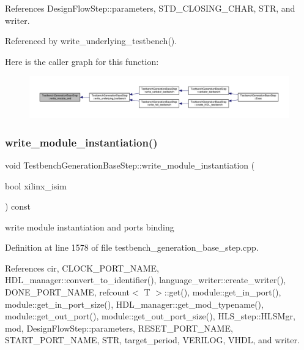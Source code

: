 References Design\+Flow\+Step\+::parameters, S\+T\+D\+\_\+\+C\+L\+O\+S\+I\+N\+G\+\_\+\+C\+H\+AR, S\+TR, and writer.



Referenced by write\+\_\+underlying\+\_\+testbench().

Here is the caller graph for this function\+:
\nopagebreak
\begin{figure}[H]
\begin{center}
\leavevmode
\includegraphics[width=350pt]{dc/d02/classTestbenchGenerationBaseStep_ae306dc453042f5b49d7a0a7efdbd094a_icgraph}
\end{center}
\end{figure}
\mbox{\label{classTestbenchGenerationBaseStep_aaa5345d601cfdea191b4f42906095e8e}} 
\subsubsection{\texorpdfstring{write\+\_\+module\+\_\+instantiation()}{write\_module\_instantiation()}}
{\footnotesize\ttfamily void Testbench\+Generation\+Base\+Step\+::write\+\_\+module\+\_\+instantiation (\begin{DoxyParamCaption}\item[{bool}]{xilinx\+\_\+isim }\end{DoxyParamCaption}) const\hspace{0.3cm}{\ttfamily [protected]}}

write module instantiation and ports binding 

Definition at line 1578 of file testbench\+\_\+generation\+\_\+base\+\_\+step.\+cpp.



References cir, C\+L\+O\+C\+K\+\_\+\+P\+O\+R\+T\+\_\+\+N\+A\+ME, H\+D\+L\+\_\+manager\+::convert\+\_\+to\+\_\+identifier(), language\+\_\+writer\+::create\+\_\+writer(), D\+O\+N\+E\+\_\+\+P\+O\+R\+T\+\_\+\+N\+A\+ME, refcount$<$ T $>$\+::get(), module\+::get\+\_\+in\+\_\+port(), module\+::get\+\_\+in\+\_\+port\+\_\+size(), H\+D\+L\+\_\+manager\+::get\+\_\+mod\+\_\+typename(), module\+::get\+\_\+out\+\_\+port(), module\+::get\+\_\+out\+\_\+port\+\_\+size(), H\+L\+S\+\_\+step\+::\+H\+L\+S\+Mgr, mod, Design\+Flow\+Step\+::parameters, R\+E\+S\+E\+T\+\_\+\+P\+O\+R\+T\+\_\+\+N\+A\+ME, S\+T\+A\+R\+T\+\_\+\+P\+O\+R\+T\+\_\+\+N\+A\+ME, S\+TR, target\+\_\+period, V\+E\+R\+I\+L\+OG, V\+H\+DL, and writer.



